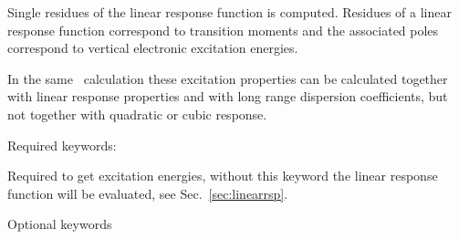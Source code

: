 Single residues of the linear
response function is
computed. Residues of a linear response function correspond to
transition moments and the associated poles
correspond to vertical electronic excitation energies.

In the same \resp\ calculation these excitation properties can be calculated
together with linear response properties
and with long range dispersion coefficients, but not
together with quadratic or cubic response.

Required keywords:

\begin{description}

\item{} Required to get excitation energies, without
this keyword the linear response function will be evaluated, see Sec.~\ref{sec:linearrsp}.

\end{description}

Optional keywords


